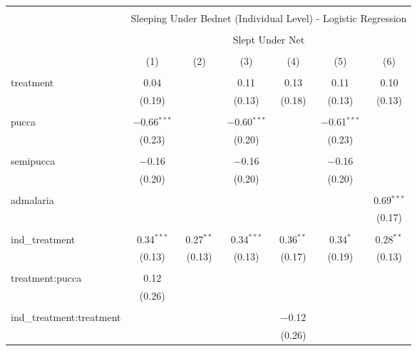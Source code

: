 
\begin{table}[!htbp] \centering 
  \caption{} 
  \label{tbl:Sleeping Under Bednet (Individual Level) - Logistic Regression} 
\begin{tabular}{@{\extracolsep{5pt}}lcccccc} 
\\[-1.8ex]\hline 
\hline \\[-1.8ex] 
 & \multicolumn{6}{c}{Sleeping Under Bednet (Individual Level) - Logistic Regression} \\ 
\cline{2-7} 
\\[-1.8ex] & \multicolumn{6}{c}{Slept Under Net} \\ 
\\[-1.8ex] & (1) & (2) & (3) & (4) & (5) & (6)\\ 
\hline \\[-1.8ex] 
 treatment & 0.04 &  & 0.11 & 0.13 & 0.11 & 0.10 \\ 
  & (0.19) &  & (0.13) & (0.18) & (0.13) & (0.13) \\ 
  & & & & & & \\ 
 pucca & $-$0.66$^{***}$ &  & $-$0.60$^{***}$ &  & $-$0.61$^{***}$ &  \\ 
  & (0.23) &  & (0.20) &  & (0.23) &  \\ 
  & & & & & & \\ 
 semipucca & $-$0.16 &  & $-$0.16 &  & $-$0.16 &  \\ 
  & (0.20) &  & (0.20) &  & (0.20) &  \\ 
  & & & & & & \\ 
 admalaria &  &  &  &  &  & 0.69$^{***}$ \\ 
  &  &  &  &  &  & (0.17) \\ 
  & & & & & & \\ 
 ind\_treatment & 0.34$^{***}$ & 0.27$^{**}$ & 0.34$^{***}$ & 0.36$^{**}$ & 0.34$^{*}$ & 0.28$^{**}$ \\ 
  & (0.13) & (0.13) & (0.13) & (0.17) & (0.19) & (0.13) \\ 
  & & & & & & \\ 
 treatment:pucca & 0.12 &  &  &  &  &  \\ 
  & (0.26) &  &  &  &  &  \\ 
  & & & & & & \\ 
 ind\_treatment:treatment &  &  &  & $-$0.12 &  &  \\ 
  &  &  &  & (0.26) &  &  \\ 

\end{tabular}
\end{table}
